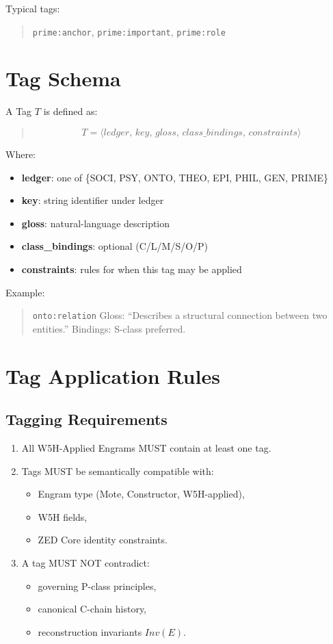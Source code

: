 Typical tags:
\begin{quote}
\texttt{prime:anchor}, \texttt{prime:important}, \texttt{prime:role}
\end{quote}

\section{Tag Schema}

A Tag $T$ is defined as:

\begin{quote}
\[
T =
\langle ledger,\, key,\, gloss,\, class\_bindings,\, constraints \rangle
\]
\end{quote}

Where:
\begin{itemize}
    \item \textbf{ledger}: one of \{SOCI, PSY, ONTO, THEO, EPI, PHIL, GEN, PRIME\}
    \item \textbf{key}: string identifier under ledger
    \item \textbf{gloss}: natural-language description
    \item \textbf{class\_bindings}: optional (C/L/M/S/O/P)
    \item \textbf{constraints}: rules for when this tag may be applied
\end{itemize}

Example:
\begin{quote}
\texttt{onto:relation}  
Gloss: ``Describes a structural connection between two entities.''  
Bindings: S-class preferred.  
\end{quote}

\section{Tag Application Rules}

\subsection{Tagging Requirements}

\begin{enumerate}
    \item All W5H-Applied Engrams MUST contain at least one tag.
    \item Tags MUST be semantically compatible with:
    \begin{itemize}
        \item Engram type (Mote, Constructor, W5H-applied),
        \item W5H fields,
        \item ZED Core identity constraints.
    \end{itemize}
    \item A tag MUST NOT contradict:
    \begin{itemize}
        \item governing P-class principles,
        \item canonical C-chain history,
        \item reconstruction invariants $Inv(E)$.
    \end{itemize}
\end{enumerate}

